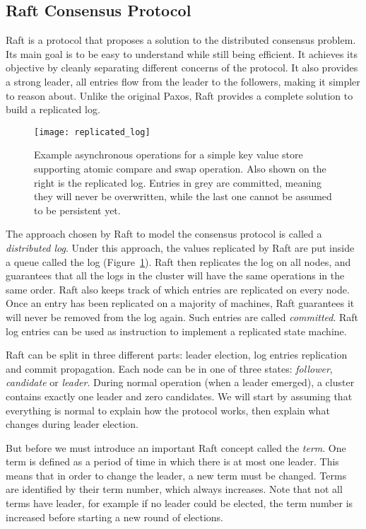 \subsection{Raft Consensus Protocol}

Raft\cite{raft} is a protocol that proposes a solution to the distributed consensus problem.
Its main goal is to be easy to understand while still being efficient.
It achieves its objective by cleanly separating different concerns of the protocol.
It also provides a strong leader, \ie all entries flow from the leader to the followers, making it simpler to reason about.
Unlike the original Paxos\cite{paxos}, Raft provides a complete solution to build a replicated log.


\begin{figure}
    \centering
    \texttt{[image: replicated\_log]}
    \caption{Example asynchronous operations for a simple key value store supporting atomic compare and swap operation.
        Also shown on the right is the replicated log.
        Entries in grey are committed, meaning they will never be overwritten, while the last one cannot be assumed to be persistent yet.
    \label{fig:replicated-log}
    }
\end{figure}

The approach chosen by Raft to model the consensus protocol is called a \emph{distributed log}.
Under this approach, the values replicated by Raft are put inside a queue called the log (Figure~\ref{fig:replicated-log}).
Raft then replicates the log on all nodes, and guarantees that all the logs in the cluster will have the same operations in the same order.
Raft also keeps track of which entries are replicated on every node.
Once an entry has been replicated on a majority of machines, Raft guarantees it will never be removed from the log again.
Such entries are called \emph{committed}.
Raft log entries can be used as instruction to implement a replicated state machine.

Raft can be split in three different parts: leader election, log entries replication and commit propagation.
Each node can be in one of three states: \emph{follower}, \emph{candidate} or \emph{leader}.
During normal operation (when a leader emerged), a cluster contains exactly one leader and zero candidates.
We will start by assuming that everything is normal to explain how the protocol works, then explain what changes during leader election.

But before we must introduce an important Raft concept called the \emph{term}.
One term is defined as a period of time in which there is at most one leader.
This means that in order to change the leader, a new term must be changed.
Terms are identified by their term number, which always increases.
Note that not all terms have leader, for example if no leader could be elected, the term number is increased before starting a new round of elections.

